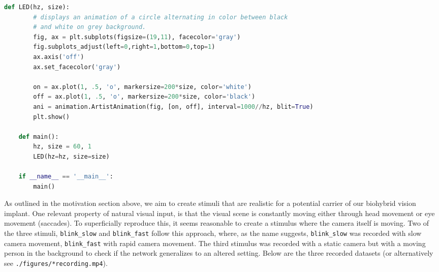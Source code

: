 \documentclass[8pt]{beamer}
\begin{document}
\begin{small}
\begin{lstlisting}[language=Python]
	def LED(hz, size):
		# displays an animation of a circle alternating in color between black 
		# and white on grey background.
		fig, ax = plt.subplots(figsize=(19,11), facecolor='gray')
		fig.subplots_adjust(left=0,right=1,bottom=0,top=1)
		ax.axis('off')
		ax.set_facecolor('gray')
	
		on = ax.plot(1, .5, 'o', markersize=200*size, color='white')
		off = ax.plot(1, .5, 'o', markersize=200*size, color='black')
		ani = animation.ArtistAnimation(fig, [on, off], interval=1000//hz, blit=True)
		plt.show()
	
	def main():
		hz, size = 60, 1
		LED(hz=hz, size=size)
	
	if __name__ == '__main__':
		main()
	\end{lstlisting}

	As outlined in the motivation section above, we aim to create stimuli that
	are realistic for a potential carrier of our biohybrid vision implant. One
	relevant property of natural visual input, is that the visual scene is
	constantly moving either through head movement or eye movement (saccades).
	To superficially reproduce this, it seems reasonable to create a stimulus
	where the camera itself is moving. Two of the three stimuli,
	\verb|blink_slow| and \verb|blink_fast| follow this approach, where, as the
	name suggests, \verb|blink_slow| was recorded with slow camera movement,
	\verb|blink_fast| with rapid camera movement. The third stimulus was
	recorded with a static camera but with a moving person in the background to
	check if the network generalizes to an altered setting. Below are the three
	recorded datasets (or alternatively see \verb|./figures/*recording.mp4|).
	\\~\\
		
	\begin{frame}
		\begin{columns}[T] %
			
		\begin{column}{.45\textwidth}
		\end{column}%
		\hfill%
			
		\begin{column}{.45\textwidth}
		\end{column}%
		\hfill%
		\end{columns}


\end{frame}
\end{small}
\end{document}
